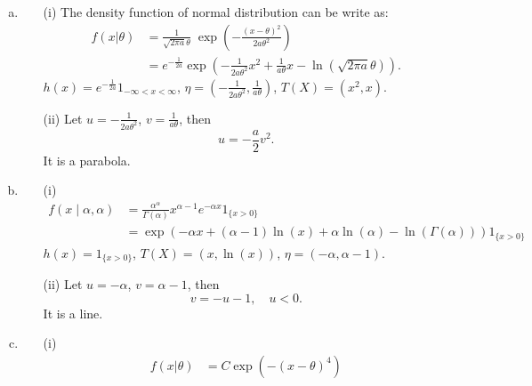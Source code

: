 \begin{solution}
    \begin{enumerate}[(a)]
        \item 
        \begin{enumerate}[(a)]
            \item[(i)] The density function of normal distribution can be write as: 
            \[
                \begin{aligned}
                    f(x|\theta)&={\frac {1}{{\sqrt {2\pi a}\theta}}}\;\exp\left(-{\frac {\left(x-\theta \right)^{2}}{2a\theta^2}}\right)\\
                    &=e^{-\frac{1}{2a}}\exp\left(-\frac{1}{2a\theta^2}x^2+\frac{1}{a\theta}x-\ln(\sqrt{2\pi a}\theta)\right). 
                \end{aligned}
            \]
            $h(x)=e^{-\frac{1}{2a}}1_{-\infty<x<\infty}$, $\eta=\left(-\frac{1}{2a\theta^2}, \frac{1}{a\theta}\right)$, $T(X)=(x^2, x)$. 
            \item[(ii)]
            Let $u=-\frac{1}{2a\theta^2}$, $v=\frac{1}{a\theta}$, then
            \[
                u=-\frac{a}{2}v^2. 
            \]
            It is a parabola. 
        \end{enumerate}
        \item 
        \begin{enumerate}[(a)]
            \item[(i)]
            \[
                \begin{aligned}
                    f(x \mid \alpha, \alpha)&=\frac{\alpha^{\alpha}}{\Gamma(\alpha)} x^{\alpha-1} e^{-\alpha x} 1_{\{x>0\}}\\
                    &=\exp\left(-\alpha x+(\alpha-1)\ln(x)+\alpha\ln(\alpha)-\ln(\Gamma(\alpha))\right)1_{\{x>0\}}
                \end{aligned}
            \]
            $h(x)=1_{\{x>0\}}$, $T(X)=(x, \ln(x))$, $\eta=(-\alpha,\alpha-1)$. 
            \item[(ii)] 
            Let $u=-\alpha$, $v=\alpha-1$, then
            \[
                v=-u-1,\quad u<0.  
            \]
            It is a line. 
        \end{enumerate}
        \item
        \begin{enumerate}[(a)]
            \item[(i)]
            \[
                \begin{aligned}
                    f(x|\theta)&=C\exp(-(x-\theta)^4)\\

\end{aligned}\]
\end{enumerate}
\end{enumerate}
\end{solution}
